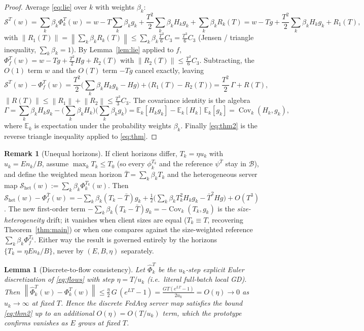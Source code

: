 \documentclass[11pt]{article}
\newtheorem{lemma}{Lemma}
\theoremstyle{definition}
\newtheorem{remark}{Remark}
\newcommand{\norm}[1]{\left\lVert#1\right\rVert}
\newcommand{\Cov}{\operatorname{Cov}}
\begin{document}
\begin{proof}
Average \eqref{eq:lie} over $k$ with weights $\beta_k$:
\[
\mathcal S^{T}(w)=\sum_k\beta_k\Phi_k^{T}(w)
=w-T\!\sum_k\beta_k g_k+\frac{T^2}{2}\sum_k\beta_k H_kg_k+\sum_k\beta_k R_k(T)
=w-Tg+\frac{T^2}{2}\sum_k\beta_kH_kg_k+R_1(T),
\]
with $\norm{R_1(T)}=\norm{\sum_k\beta_kR_k(T)}\le\sum_k\beta_k\tfrac{T^3}{6}C_3
=\tfrac{T^3}{6}C_3$ (Jensen / triangle inequality, $\sum_k\beta_k=1$). By
Lemma~\ref{lem:lie} applied to $f$,
$\Phi_f^{T}(w)=w-Tg+\tfrac{T^2}{2}Hg+R_2(T)$ with
$\norm{R_2(T)}\le\tfrac{T^3}{6}C_3$. Subtracting, the $O(1)$ term $w$ and the
$O(T)$ term $-Tg$ cancel exactly, leaving
\[
\mathcal S^{T}(w)-\Phi_f^{T}(w)
=\frac{T^2}{2}\Big(\sum_k\beta_kH_kg_k-Hg\Big)+\big(R_1(T)-R_2(T)\big)
=\frac{T^2}{2}\,\Gamma+R(T),
\]
$\norm{R(T)}\le\norm{R_1}+\norm{R_2}\le\tfrac{T^3}{3}C_3$. The covariance
identity is the algebra
\[
\Gamma=\sum_k\beta_kH_kg_k-\Big(\sum_k\beta_kH_k\Big)\Big(\sum_k\beta_kg_k\Big)
=\mathbb E_k[H_kg_k]-\mathbb E_k[H_k]\,\mathbb E_k[g_k]=\Cov_k(H_k,g_k),
\]
where $\mathbb E_k$ is expectation under the probability weights $\beta_k$.
Finally \eqref{eq:thm2} is the reverse triangle inequality applied to
\eqref{eq:thm}.
\end{proof}

\begin{remark}[Unequal horizons]\label{rem:unequal}
If client horizons differ, $T_k=\eta u_k$ with $u_k=En_k/B$, assume
$\max_k T_k\le T_0$ (so every $\phi_k^{T_k}$ and the reference $\psi^{\bar T}$
stay in $\mathcal B$), and define the weighted mean horizon
$\bar T=\sum_k\beta_k T_k$ and the heterogeneous server map
$\mathcal S_{\mathrm{het}}(w):=\sum_k\beta_k\Phi_k^{T_k}(w)$. Then
$\mathcal S_{\mathrm{het}}(w)-\Phi_f^{\bar T}(w)=-\sum_k\beta_k(T_k-\bar T)g_k
+\tfrac12\big(\sum_k\beta_kT_k^2H_kg_k-\bar T^2Hg\big)+O(T^3)$. The new
first-order term $-\sum_k\beta_k(T_k-\bar T)g_k=-\Cov_k(T_k,g_k)$ is the
\emph{size-heterogeneity} drift; it vanishes when client sizes are equal
($T_k\equiv T$, recovering Theorem~\ref{thm:main}) or when one compares against
the size-weighted reference $\sum_k\beta_k\Phi_f^{T_k}$. Either way the result is
governed entirely by the horizons $\{T_k=\eta E n_k/B\}$, never by $(E,B,\eta)$
separately.
\end{remark}

\begin{lemma}[Discrete-to-flow consistency]\label{lem:euler}
Let $\widehat\Phi_k^{T}$ be the $u_k$-step explicit Euler discretization of
\eqref{eq:flows} with step $\eta=T/u_k$ (i.e.\ literal full-batch local GD). Then
$\norm{\widehat\Phi_k^{T}(w)-\Phi_k^{T}(w)}\le \tfrac{\eta}{2}\,G\,(e^{LT}-1)
=\tfrac{GT(e^{LT}-1)}{2u_k}=O(\eta)\to0$ as $u_k\to\infty$ at fixed $T$. Hence the discrete
FedAvg server map satisfies the bound \eqref{eq:thm2} up to an additional
$O(\eta)=O(T/u_k)$ term, which the prototype confirms vanishes as $E$ grows at
fixed $T$.
\end{lemma}
\end{document}
